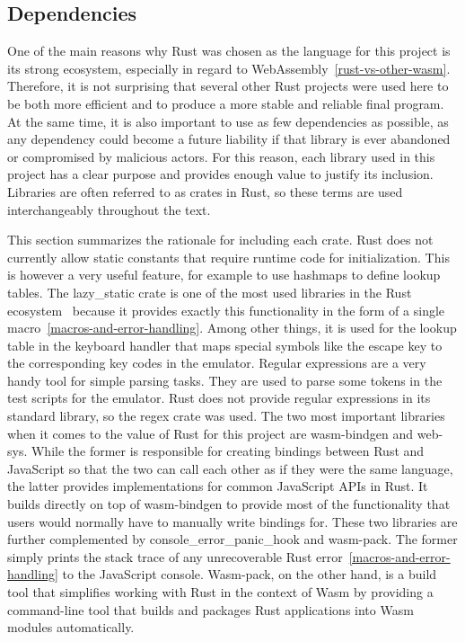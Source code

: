 \subsection{Dependencies}
\label{rust-deps}
One of the main reasons why Rust was chosen as the language for this project is its strong ecosystem, especially in regard to WebAssembly~\ref{rust-vs-other-wasm}.
Therefore, it is not surprising that several other Rust projects were used here to be both more efficient and to produce a more stable and reliable final program.
At the same time, it is also important to use as few dependencies as possible, as any dependency could become a future liability if that library is ever abandoned or compromised by malicious actors.
For this reason, each library used in this project has a clear purpose and provides enough value to justify its inclusion. Libraries are often referred to as crates in Rust, so these terms are used interchangeably throughout the text.

This section summarizes the rationale for including each crate.
Rust does not currently allow static constants that require runtime code for initialization. This is however a very useful feature, for example to use hashmaps to define lookup tables.
The lazy\_static crate is one of the most used libraries in the Rust ecosystem~\cite[Downloads all time]{lazystatic} because it provides exactly this functionality in the form of a single macro~\ref{macros-and-error-handling}. Among other things, it is used for the lookup table in the keyboard handler that maps special symbols like the escape key to the corresponding key codes in the emulator.
Regular expressions are a very handy tool for simple parsing tasks. They are used to parse some tokens in the test scripts for the emulator. Rust does not provide regular expressions in its standard library, so the regex crate was used.
\label{web-sys}
The two most important libraries when it comes to the value of Rust for this project are wasm-bindgen and web-sys.
While the former is responsible for creating bindings between Rust and JavaScript so that the two can call each other as if they were the same language, the latter provides implementations for common JavaScript APIs in Rust.
It builds directly on top of wasm-bindgen to provide most of the functionality that users would normally have to manually write bindings for.
These two libraries are further complemented by console\_error\_panic\_hook and wasm-pack.
The former simply prints the stack trace of any unrecoverable Rust error~\ref{macros-and-error-handling} to the JavaScript console.
Wasm-pack, on the other hand, is a build tool that simplifies working with Rust in the context of Wasm by providing a command-line tool that builds and packages Rust applications into Wasm modules automatically.

